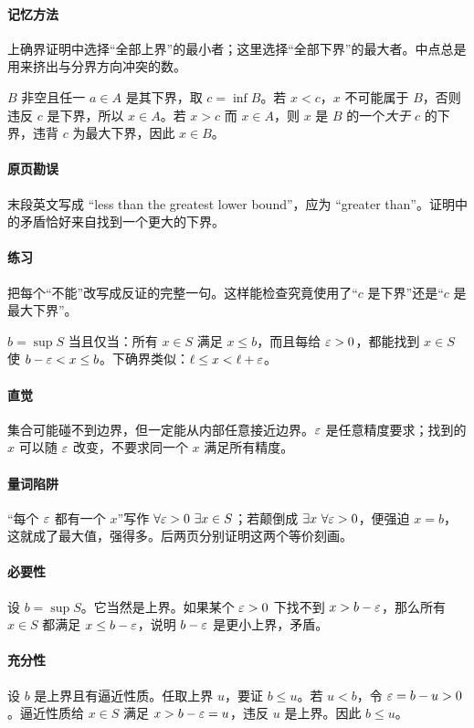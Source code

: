 \paragraph{记忆方法}上确界证明中选择“全部上界”的最小者；这里选择“全部下界”的最大者。中点总是用来挤出与分界方向冲突的数。

$B$ 非空且任一 $a\in A$ 是其下界，取 $c=\inf B$。若 $x<c$，$x$ 不可能属于 $B$，否则违反 $c$ 是下界，所以 $x\in A$。若 $x>c$ 而 $x\in A$，则 $x$ 是 $B$ 的一个\emph{大于} $c$ 的下界，违背 $c$ 为最大下界，因此 $x\in B$。
\paragraph{原页勘误}末段英文写成 ``less than the greatest lower bound''，应为 ``greater than''。证明中的矛盾恰好来自找到一个更大的下界。
\paragraph{练习}把每个“不能”改写成反证的完整一句。这样能检查究竟使用了“$c$ 是下界”还是“$c$ 是最大下界”。

$b=\sup S$ 当且仅当：所有 $x\in S$ 满足 $x\le b$，而且每给 $\varepsilon>0$，都能找到 $x\in S$ 使 $b-\varepsilon<x\le b$。下确界类似：$\ell\le x<\ell+\varepsilon$。
\paragraph{直觉}集合可能碰不到边界，但一定能从内部任意接近边界。$\varepsilon$ 是任意精度要求；找到的 $x$ 可以随 $\varepsilon$ 改变，不要求同一个 $x$ 满足所有精度。
\paragraph{量词陷阱}“每个 $\varepsilon$ 都有一个 $x$”写作 $\forall\varepsilon>0\ \exists x\in S$；若颠倒成 $\exists x\ \forall\eps>0$，便强迫 $x=b$，这就成了最大值，强得多。后两页分别证明这两个等价刻画。

\paragraph{必要性}设 $b=\sup S$。它当然是上界。如果某个 $\varepsilon>0$ 下找不到 $x>b-\varepsilon$，那么所有 $x\in S$ 都满足 $x\le b-\varepsilon$，说明 $b-\varepsilon$ 是更小上界，矛盾。
\paragraph{充分性}设 $b$ 是上界且有逼近性质。任取上界 $u$，要证 $b\le u$。若 $u<b$，令 $\varepsilon=b-u>0$。逼近性质给 $x\in S$ 满足 $x>b-\varepsilon=u$，违反 $u$ 是上界。因此 $b\le u$。
